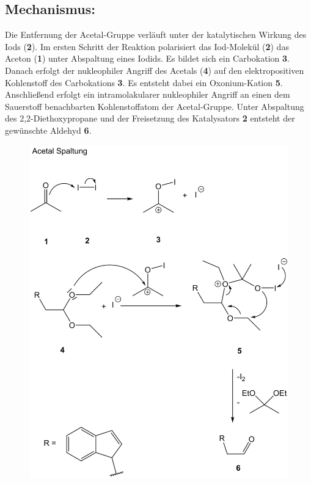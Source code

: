 \documentclass[12pt]{article}
\begin{document}
\begin{onehalfspace}
\section{Mechanismus\cite{bio}:}
Die Entfernung der Acetal-Gruppe verläuft unter der katalytischen Wirkung des Iods (\textbf{2}). 
Im ersten Schritt der Reaktion polarisiert das Iod-Molekül (\textbf{2}) das Aceton (\textbf{1}) unter Abspaltung eines Iodids. Es bildet sich ein Carbokation \textbf{3}. Danach erfolgt der nukleophiler Angriff des Acetals (\textbf{4}) auf den elektropositiven Kohlenstoff des Carbokations \textbf{3}. 
Es entsteht dabei ein Oxonium-Kation \textbf{5}. Anschließend erfolgt ein intramolakularer nukleophiler Angriff an einen dem Sauerstoff benachbarten Kohlenstoffatom der Acetal-Gruppe. Unter Abspaltung des 2,2-Diethoxypropane und der Freisetzung des Katalysators \textbf{2} entsteht der gewünschte Aldehyd \textbf{6}.
\begin{figure}[!htbp]
\centering
\includegraphics[scale=0.25]{mechan.png}
\end{figure}


\end{onehalfspace}
\end{document}
